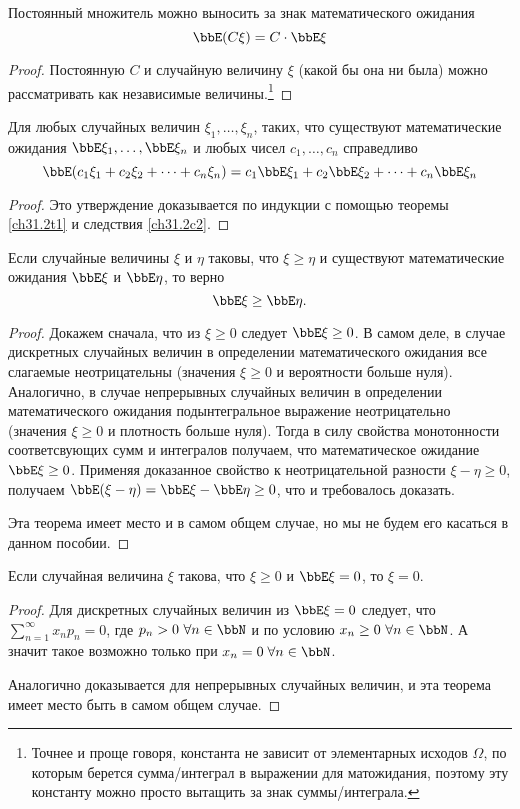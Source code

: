 \begin{cons}\label{ch31.2c2}
Постоянный множитель можно выносить за знак математического ожидания
$$
\bbE(C\xi)=C\cdot \bbE\xi
$$
\end{cons}
\begin{proof}
Постоянную $C$ и случайную величину $\xi$ (какой бы она ни была) можно рассматривать как независимые величины.\footnote{Точнее и проще говоря, константа не зависит от элементарных исходов $\Omega$, по которым берется сумма/интеграл в выражении для матожидания, поэтому эту константу можно просто вытащить за знак суммы/интеграла.}
\end{proof}
\begin{cons}[линейность] Для любых случайных величин $\xi_1,\dots,\xi_n$, таких, что существуют математические ожидания $\bbE\xi_1,\dots, \bbE\xi_n$ и любых чисел $c_1,\dots, c_n$ справедливо
$$
\bbE(c_1\xi_1+c_2\xi_2+\dots+c_n\xi_n) = c_1\bbE\xi_1+c_2\bbE\xi_2+\dots+c_n\bbE\xi_n
$$
\end{cons}
\begin{proof} Это утверждение доказывается по индукции с помощью теоремы \ref{ch31.2t1} и следствия \ref{ch31.2c2}.
\end{proof}
\begin{thm}[монотонность] \label{ch31.2t4}
Если случайные величины $\xi$ и $\eta$ таковы, что $\xi \ge\eta$ и существуют математические ожидания $\bbE\xi$ и $\bbE\eta$, то верно
$$
\bbE\xi\ge \bbE\eta.
$$
\end{thm}
\begin{proof}
Докажем сначала, что из $\xi\ge 0$ следует $\bbE\xi\ge0$. В самом деле, в случае дискретных случайных величин в определении математического ожидания все слагаемые неотрицательны (значения $\xi \ge 0$ и вероятности больше нуля). Аналогично, в случае непрерывных случайных величин в определении математического ожидания подынтегральное выражение неотрицательно (значения $\xi \ge 0$ и плотность больше нуля). Тогда в силу свойства монотонности соответсвующих сумм и интегралов получаем, что математическое ожидание $\bbE\xi \ge 0$. Применяя доказанное свойство к неотрицательной разности $\xi-\eta \ge 0$, получаем $\bbE(\xi-\eta)=\bbE\xi-\bbE\eta\ge0$, что и требовалось доказать.

Эта теорема имеет место и в самом общем случае, но мы не будем его касаться в данном пособии.
\end{proof}
\begin{thm}\label{ch31.2t3}
Если случайная величина $\xi$ такова, что $\xi\ge 0$ и $\bbE\xi=0$, то $\xi=0$.
\end{thm}
\begin{proof}
Для дискретных случайных величин из $\bbE\xi=0$ следует, что $\sum\limits_{n=1}^{\infty} x_n p_n = 0$, где $p_n > 0 \ \forall n\in \bbN$ и по условию $x_n \ge 0 \ \forall n\in \bbN$. А значит такое возможно только при $x_n = 0 \; \forall n\in \bbN$.

Аналогично доказывается для непрерывных случайных величин, и эта теорема имеет место быть в самом общем случае.
\end{proof}

